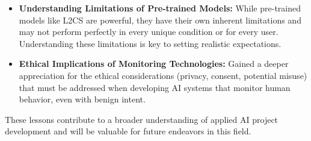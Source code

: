 \begin{itemize}
    \item \textbf{Understanding Limitations of Pre-trained Models:} While pre-trained models like L2CS are powerful, they have their own inherent limitations and may not perform perfectly in every unique condition or for every user. Understanding these limitations is key to setting realistic expectations.
    \item \textbf{Ethical Implications of Monitoring Technologies:} Gained a deeper appreciation for the ethical considerations (privacy, consent, potential misuse) that must be addressed when developing AI systems that monitor human behavior, even with benign intent.
\end{itemize}
These lessons contribute to a broader understanding of applied AI project development and will be valuable for future endeavors in this field.